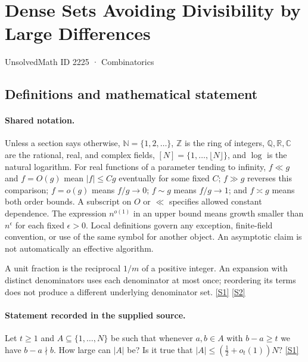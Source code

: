 \documentclass[11pt,a4paper]{article}
\newcommand{\N}{\mathbb{N}}
\newcommand{\Z}{\mathbb{Z}}
\newcommand{\Q}{\mathbb{Q}}
\newcommand{\R}{\mathbb{R}}
\newcommand{\C}{\mathbb{C}}
\newcommand{\sref}[2]{\hyperlink{source:#1:#2}{[S#2]}}
\begin{document}

\setcounter{section}{2224}

\section{Dense Sets Avoiding Divisibility by Large Differences}\label{2225}

{\small\sffamily UnsolvedMath ID 2225 · Combinatorics}

\subsection{Definitions and mathematical statement}

\paragraph{Shared notation.}Unless a section says otherwise, $\N=\{1,2,\ldots\}$,
$\Z$ is the ring of integers, $\Q,\R,\C$ are the rational, real, and complex
fields, $[N]=\{1,\ldots,\lfloor N\rfloor\}$, and $\log$ is the natural
logarithm. For real functions of a parameter tending to infinity,
$f\ll g$ and $f=O(g)$ mean $|f|\leq Cg$ eventually for some fixed $C$;
$f\gg g$ reverses this comparison; $f=o(g)$ means $f/g\to0$;
$f\sim g$ means $f/g\to1$; and $f\asymp g$ means both order bounds.
A subscript on $O$ or $\ll$ specifies allowed constant dependence.
The expression $n^{o(1)}$ in an upper bound means growth smaller than
$n^\epsilon$ for each fixed $\epsilon>0$. Local definitions govern any
exception, finite-field convention, or use of the same symbol for another
object. An asymptotic claim is not automatically an effective algorithm.



A unit fraction is the reciprocal $1/m$ of a positive integer. An expansion with distinct denominators uses each denominator at most once; reordering its terms does not produce a different underlying denominator set. \sref{2225}{1} \sref{2225}{2}

\paragraph{Statement recorded in the supplied source.}
Let $t\geq 1$ and $A\subseteq \{1,\ldots,N\}$ be such that whenever $a,b\in A$ with $b-a\geq t$ we have $b-a\nmid b$. How large can $\lvert A\rvert$ be? Is it true that $ \lvert A\rvert \leq \left(\frac{1}{2}+o_t(1)\right)N? $ \sref{2225}{1}
\end{document}
